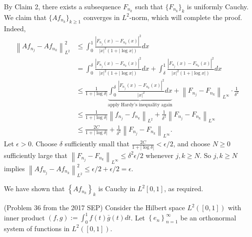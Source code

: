 \documentclass{exam}
\theoremstyle{problemstyle}
\newcommand{\norm}[1]{\left\lVert#1\right\rVert} %
\newcommand{\1}[1]{\textbf{1}_{\left[#1\right]}} %
\begin{document}
\begin{questions}
\begin{solution}
  By Claim 2, there exists a subsequence $F_{n_{k}}$ such that $\{F_{n_{k}}\}_{k}$ is uniformly Cauchy. We claim that $\{Af_{n_{k}}\}_{k\geq 1}$ converges in $L^{2}$-norm, which will complete the proof. Indeed,
  \begin{align*}
    \norm{Af_{n_{j}}-Af_{n_{k}}}_{L^{2}}^{2}
    &\leq \int_{0}^{1}\frac{|F_{n_{j}}(x)-F_{n_{k}}(x)|^{2}}{|x|^{2}\left( 1+|\log x| \right)} dx\\
    &= \int_{0}^{\delta}\frac{|F_{n_{j}}(x)-F_{n_{k}}(x)|^{2}}{|x|^{2}\left( 1+|\log x| \right)} dx + \int_{\delta}^{1}\frac{|F_{n_{j}}(x)-F_{n_{k}}(x)|^{2}}{|x|^{2}\left( 1+|\log x| \right)} dx\\
    &\leq \frac{1}{1+|\log \delta |} \underbrace{\int_{0}^{\delta}\frac{|F_{n_{j}}(x)-F_{n_{k}}(x)|^{2}}{|x|^{2}} dx}_{\text{apply Hardy's inequality again}} + \norm{F_{n_{j}}-F_{n_{k}}}_{L^{\infty}} \cdot\frac{1}{\delta^{2}}\\
    &\leq \frac{1}{1+|\log \delta |} \norm{f_{n_{j}}-f_{n_{k}}}_{L^{2}} + \frac{1}{\delta^{2}} \norm{F_{n_{j}}-F_{n_{k}}}_{L^{\infty}}\\
    &\leq \frac{2C}{1+|\log \delta|} + \frac{1}{\delta^{2}} \norm{F_{n_{j}}-F_{n_{k}}}_{L^{\infty}}.
  \end{align*}
  Let $\epsilon>0$. Choose $\delta$ sufficiently small that $\frac{2C}{1+|\log \delta|}<\epsilon/2$, and choose $N\geq 0$ sufficiently large that $\norm{F_{n_{j}}-F_{n_{k}}}_{L^{\infty}}\leq \delta^{2}\epsilon/2$ whenever $j,k\geq N$. So $j,k\geq N$ implies $\norm{Af_{n_{j}}-Af_{n_{k}}}_{L^{2}}^{2} \leq \epsilon/2 + \epsilon/2= \epsilon$.
  
  We have shown that $\left\{ Af_{n_{k}} \right\}_{k}$ is Cauchy in $L^2[0,1]$, as required.
\end{solution}


\question (Problem 36 from the 2017 SEP) Consider the Hilbert space $L^{2}([0,1])$ with inner product $(f,g):=\int_{0}^{1}f(t)\bar{g}(t)dt$. Let $\left\{ e_{n} \right\}_{n=1}^{\infty}$ be an orthonormal system of functions in $L^{2}([0,1])$.
\end{questions}
\end{document}
